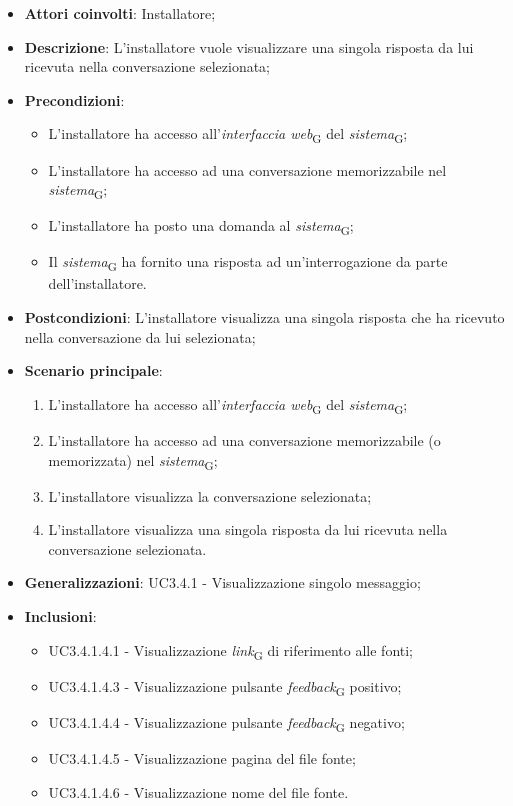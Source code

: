 \begin{itemize}
    \item \textbf{Attori coinvolti}: Installatore;
    \item \textbf{Descrizione}: L'installatore vuole visualizzare una singola risposta da lui ricevuta nella conversazione selezionata;
    \item \textbf{Precondizioni}: 
    \begin{itemize}
        \item L’installatore ha accesso all’\textit{interfaccia web}\textsubscript{G} del \textit{sistema}\textsubscript{G};
        \item L’installatore ha accesso ad una conversazione memorizzabile nel \textit{sistema}\textsubscript{G};
        \item L'installatore ha posto una domanda al \textit{sistema}\textsubscript{G};
        \item Il \textit{sistema}\textsubscript{G} ha fornito una risposta ad un’interrogazione da parte dell’installatore.
    \end{itemize}
    \item \textbf{Postcondizioni}: L'installatore visualizza una singola risposta che ha ricevuto nella conversazione da lui selezionata;
    \item \textbf{Scenario principale}:
    \begin{enumerate}
        \item L’installatore ha accesso all’\textit{interfaccia web}\textsubscript{G} del \textit{sistema}\textsubscript{G};
        \item L’installatore ha accesso ad una conversazione memorizzabile (o memorizzata) nel \textit{sistema}\textsubscript{G};
        \item L'installatore visualizza la conversazione selezionata;
        \item L'installatore visualizza una singola risposta da lui ricevuta nella conversazione selezionata.
    \end{enumerate}
    \item \textbf{Generalizzazioni}: UC3.4.1 - Visualizzazione singolo messaggio;
    \item \textbf{Inclusioni}: 
    \begin{itemize}
        \item UC3.4.1.4.1 - Visualizzazione  \textit{link}\textsubscript{G} di riferimento alle fonti;
        \item UC3.4.1.4.3 - Visualizzazione pulsante \textit{feedback}\textsubscript{G} positivo;
        \item UC3.4.1.4.4 - Visualizzazione pulsante \textit{feedback}\textsubscript{G} negativo;
        \item UC3.4.1.4.5 - Visualizzazione pagina del file fonte;
        \item UC3.4.1.4.6 - Visualizzazione nome del file fonte.
    \end{itemize}
\end{itemize}

